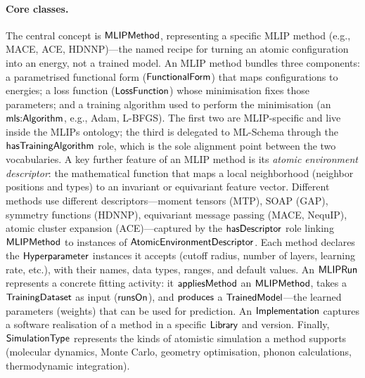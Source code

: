 \paragraph{Core classes.}
The central concept is $\mathsf{MLIPMethod}$, representing a specific
MLIP method (e.g., MACE, ACE, HDNNP)---the named recipe for turning
an atomic configuration into an energy, not a trained model. An MLIP
method bundles three components: a parametrised functional form
($\mathsf{FunctionalForm}$) that maps configurations to energies; a loss
function ($\mathsf{LossFunction}$) whose minimisation fixes those
parameters; and a training algorithm used to perform the minimisation
(an $\mathsf{mls{:}Algorithm}$, e.g., Adam, L-BFGS). The first two are
MLIP-specific and live inside the MLIPs ontology; the third is
delegated to ML-Schema through the $\mathsf{hasTrainingAlgorithm}$ role,
which is the sole alignment point between the two vocabularies. A
key further feature of an MLIP method is its \emph{atomic environment
descriptor}: the mathematical function that maps a local neighborhood
(neighbor positions and types) to an invariant or equivariant feature
vector. Different methods use different descriptors---moment tensors
(MTP), SOAP (GAP), symmetry functions (HDNNP), equivariant message
passing (MACE, NequIP), atomic cluster expansion (ACE)---captured by
the $\mathsf{hasDescriptor}$ role linking $\mathsf{MLIPMethod}$ to instances of
$\mathsf{AtomicEnvironmentDescriptor}$. Each method declares the
$\mathsf{Hyperparameter}$ instances it accepts (cutoff radius, number of
layers, learning rate, etc.), with their names, data types, ranges,
and default values. An $\mathsf{MLIPRun}$ represents a concrete fitting
activity: it $\mathsf{appliesMethod}$ an $\mathsf{MLIPMethod}$, takes a
$\mathsf{TrainingDataset}$ as input ($\mathsf{runsOn}$), and $\mathsf{produces}$ a
$\mathsf{TrainedModel}$---the learned parameters (weights) that can be used
for prediction. An $\mathsf{Implementation}$ captures a software realisation
of a method in a specific $\mathsf{Library}$ and version. Finally,
$\mathsf{SimulationType}$ represents the kinds of atomistic simulation a
method supports (molecular dynamics, Monte Carlo, geometry
optimisation, phonon calculations, thermodynamic integration).

